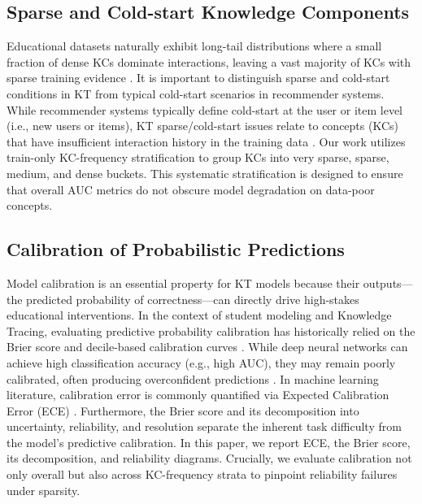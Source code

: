 \subsection{Sparse and Cold-start Knowledge Components}
Educational datasets naturally exhibit long-tail distributions where a small fraction of dense KCs dominate interactions, leaving a vast majority of KCs with sparse training evidence \cite{choi2020ednet,liu2023xes3g5m}. It is important to distinguish sparse and cold-start conditions in KT from typical cold-start scenarios in recommender systems. While recommender systems typically define cold-start at the user or item level (i.e., new users or items), KT sparse/cold-start issues relate to concepts (KCs) that have insufficient interaction history in the training data \cite{pelanek2015modeling,choffin2019das3h}. Our work utilizes train-only KC-frequency stratification to group KCs into very sparse, sparse, medium, and dense buckets. This systematic stratification is designed to ensure that overall AUC metrics do not obscure model degradation on data-poor concepts.

\subsection{Calibration of Probabilistic Predictions}
Model calibration is an essential property for KT models because their outputs---the predicted probability of correctness---can directly drive high-stakes educational interventions. In the context of student modeling and Knowledge Tracing, evaluating predictive probability calibration has historically relied on the Brier score and decile-based calibration curves \cite{pelanek2015metrics}. While deep neural networks can achieve high classification accuracy (e.g., high AUC), they may remain poorly calibrated, often producing overconfident predictions \cite{guo2017calibration}. In machine learning literature, calibration error is commonly quantified via Expected Calibration Error (ECE) \cite{naeini2015obtaining}. Furthermore, the Brier score \cite{brier1950verification} and its decomposition into uncertainty, reliability, and resolution \cite{degroot1983comparison} separate the inherent task difficulty from the model's predictive calibration. In this paper, we report ECE, the Brier score, its decomposition, and reliability diagrams. Crucially, we evaluate calibration not only overall but also across KC-frequency strata to pinpoint reliability failures under sparsity.


